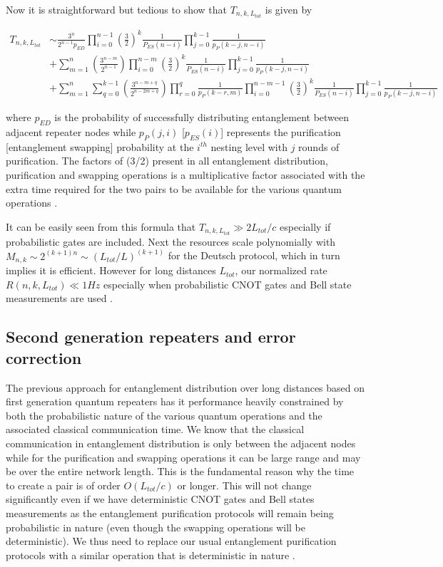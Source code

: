 \documentclass[twocolumn, aps, rmp, amsmath, amssymb, nofootinbib, superscriptaddress, longbibliography, floatfix, table-of-contents, eqsecnum]{revtex4-1}
\begin{document}
Now it is straightforward but tedious to show that $T_{n,k,L_{tot}}$ is given by \cite{braztzik2013}
\begin{widetext}
\begin{align*}
 T_{n,k,L_{tot}} &\sim \frac{3^n}{2^{n-1} p_{ED}} \prod_{i=0}^{n-1} \left(\frac{3}{2}\right)^{k}  \frac{1}{P_{ES}(n-i)  }\prod_{j=0}^{k-1} \frac{1}{p_P(k-j,n-i)}  \nonumber \\
 &+\sum_{m=1}^n\left(\frac{3^{n-m}}{2^{n-1}}\right) \prod_{i=0}^{n-m}   \left(\frac{3}{2}\right)^{k} \frac{1}{P_{ES}(n-i)}  \prod_{j=0}^{k-1}  \frac{1}{p_P(k-j,n-i)}  \\
&+\sum_{m=1}^n {\sum_{q=0}^{k-1} \left(\frac{3^{n-m+q}}{2^{n- 2 m+q}}\right) \prod_{r=0}^{q}\frac{1}{p_P(k-r,m)}} 
\prod_{i=0}^{n-m-1}   \left(\frac{3}{2}\right)^{k} \frac{1}{P_{ES}(n-i)}  \prod_{j=0}^{k-1}  \frac{1}{p_P(k-j,n-i)} \nonumber 
\end{align*}
\end{widetext}
where $p_{ED}$ is the probability of successfully distributing entanglement between adjacent repeater nodes while $p_P(j,i)$ [$p_{ES}(i)$] represents the purification [entanglement swapping] probability at the $i^{th}$ nesting level with $j$ rounds of purification.  The factors of (3/2) present in all entanglement distribution,  purification and swapping operations is a multiplicative factor associated with the extra time required for the two pairs to be available for the various quantum operations \cite{SSRG09}.


It can be easily seen from this formula that $ T_{n,k,L_{tot}} \gg 2 L_{tot} / c$ especially if probabilistic gates are included. Next the resources scale polynomially with  $M_{n,k}\sim 2^{(k+1)n}\sim (L_{tot}/L)^{(k+1)}$ for the Deutsch protocol, which in turn implies it is efficient. However for long distances $L_{tot}$, our normalized rate $R(n,k,L_{tot})\ll 1 Hz$ especially when probabilistic CNOT gates and Bell state measurements are used \cite{jiang09,munro10}.

\subsection{Second generation repeaters and error correction}

The previous approach for entanglement distribution over long distances based on first generation quantum repeaters has it performance  heavily constrained by both the probabilistic nature of the various quantum operations and the associated classical communication time. We know that the classical communication in entanglement distribution is only between the adjacent nodes while for the purification and swapping operations it can be large range and may be over the entire network length. This is the fundamental reason why the time to create a pair is of order $O(L_{tot} / c)$ or longer. This will not change significantly even if we have deterministic CNOT gates and Bell states measurements as the entanglement purification protocols  will remain being probabilistic in nature (even though the swapping operations will be deterministic). We thus need to replace our usual entanglement purification protocols with a similar operation that is deterministic in nature \cite{jiang09,munro10}.
\end{document}

